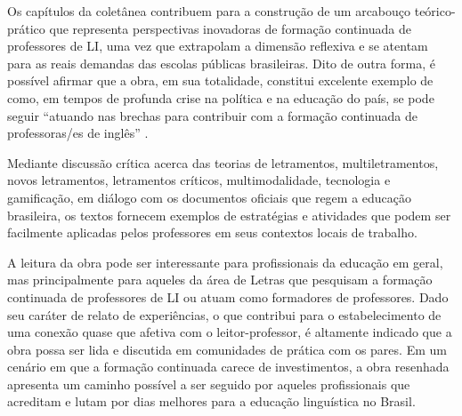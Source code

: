 \documentclass[portuguese]{textolivre}
\begin{document}
Os capítulos da coletânea contribuem para a construção de um arcabouço teórico-prático que representa perspectivas inovadoras de formação continuada de professores de LI, uma vez que extrapolam a dimensão reflexiva e se atentam para as reais demandas das escolas públicas brasileiras. Dito de outra forma, é possível afirmar que a obra, em sua totalidade, constitui excelente exemplo de como, em tempos de profunda crise na política e na educação do país, se pode seguir “atuando nas brechas para contribuir com a formação continuada de professoras/es de inglês” \cite[p. 11]{pessoa_ousadia_2018}. 

Mediante discussão crítica acerca das teorias de letramentos, multiletramentos, novos letramentos, letramentos críticos, multimodalidade, tecnologia e gamificação, em diálogo com os documentos oficiais que regem a educação brasileira, os textos fornecem exemplos de estratégias e atividades que podem ser facilmente aplicadas pelos professores em seus contextos locais de trabalho.

A leitura da obra pode ser interessante para profissionais da educação em geral, mas principalmente para aqueles da área de Letras que pesquisam a formação continuada de professores de LI ou atuam como formadores de professores. Dado seu caráter de relato de experiências, o que contribui para o estabelecimento de uma conexão quase que afetiva com o leitor-professor, é altamente indicado que a obra possa ser lida e discutida em comunidades de prática com os pares. Em um cenário em que a formação continuada carece de investimentos, a obra resenhada apresenta um caminho possível a ser seguido por aqueles profissionais que acreditam e lutam por dias melhores para a educação linguística no Brasil.

\printbibliography\label{sec-bib}
\end{document}
